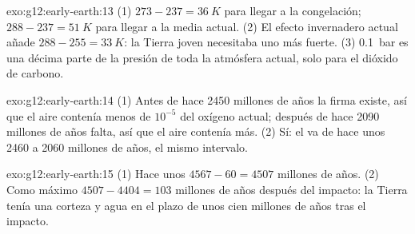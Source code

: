 \begin{solution}{exo:g12:early-earth:13}
(1) $273 - 237 = \qty{36}{K}$ para llegar a la congelación; $288 - 237 = \qty{51}{K}$ para llegar a la media actual. (2) El efecto invernadero actual
añade $288 - 255 =
\qty{33}{K}$: la Tierra joven necesitaba uno más fuerte.
(3) \qty{0.1}{bar} es una décima parte de la presión de toda la atmósfera
actual, solo para el dióxido de carbono.
\end{solution}

\begin{solution}{exo:g12:early-earth:14}
(1) Antes de hace 2450 millones de años la firma existe, así que el aire
contenía menos de $10^{-5}$ del oxígeno actual; después de hace 2090 millones
de años falta, así que el aire contenía más. (2) Sí: el  va de hace unos 2460 a 2060 millones de años, el mismo intervalo.
\end{solution}

\begin{solution}{exo:g12:early-earth:15}
(1) Hace unos $4567 - 60 = 4507$ millones de años. (2) Como máximo $4507 - 4404 =
103$ millones de años después del impacto: la Tierra tenía una corteza y agua
en el plazo de unos cien millones de años tras el impacto.
\end{solution}

